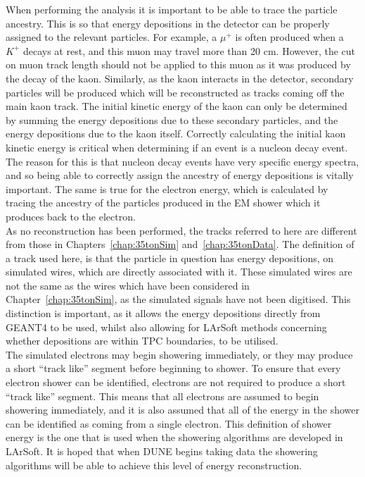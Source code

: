 When performing the analysis it is important to be able to trace the particle ancestry. This is so that energy depositions in the detector can be properly assigned to the relevant particles. For example, a $\mu^{+}$ is often produced when a $K^{+}$ decays at rest, and this muon may travel more than 20 cm. However, the cut on muon track length should not be applied to this muon as it was produced by the decay of the kaon. Similarly, as the kaon interacts in the detector, secondary particles will be produced which will be reconstructed as tracks coming off the main kaon track. The initial kinetic energy of the kaon can only be determined by summing the energy depositions due to these secondary particles, and the energy depositions due to the kaon itself. Correctly calculating the initial kaon kinetic energy is critical when determining if an event is a nucleon decay event. The reason for this is that nucleon decay events have very specific energy spectra, and so being able to correctly assign the ancestry of energy depositions is vitally important. The same is true for the electron energy, which is calculated by tracing the ancestry of the particles produced in the EM shower which it produces back to the electron. \\

As no reconstruction has been performed, the tracks referred to here are different from those in Chapters~\ref{chap:35tonSim} and~\ref{chap:35tonData}. The definition of a track used here, is that the particle in question has energy depositions, on simulated wires, which are directly associated with it. These simulated wires are not the same as the wires which have been considered in Chapter~\ref{chap:35tonSim}, as the simulated signals have not been digitised. This distinction is important, as it allows the energy depositions directly from GEANT4 to be used, whilst also allowing for LArSoft methods concerning whether depositions are within TPC boundaries, to be utilised. \\

The simulated electrons may begin showering immediately, or they may produce a short ``track like'' segment before beginning to shower. To ensure that every electron shower can be identified, electrons are not required to produce a short ``track like'' segment. This means that all electrons are assumed to begin showering immediately, and it is also assumed that all of the energy in the shower can be identified as coming from a single electron. This definition of shower energy is the one that is used when the showering algorithms are developed in LArSoft. It is hoped that when DUNE begins taking data the showering algorithms will be able to achieve this level of energy reconstruction. \\


